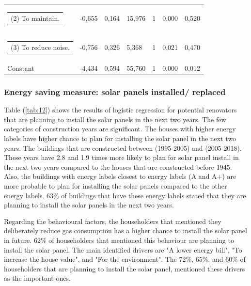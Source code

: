 \documentclass[preprint,12pt,3p]{elsarticle}
\begin{document}
\begin{footnotesize}
\begin{longtable}[c]{@{}lllllll@{}}
\begin{tabular}[c]{@{}l@{}}(2) To maintain.\end{tabular}                     & -0,655 & 0,164 & 15,976 & 1  & 0,000 & 0,520  \\
\begin{tabular}[c]{@{}l@{}}(3) To reduce noise.\end{tabular}                         & -0,756 & 0,326 & 5,368  & 1  & 0,021 & 0,470  \\
Constant                                                                                         & -4,434 & 0,594 & 55,760 & 1  & 0,000 & 0,012  \\* \bottomrule
\end{longtable}
\end{footnotesize}

\pagebreak

\subsubsection{Energy saving measure: solar panels installed/ replaced}


Table (\ref{tab:12}) shows the results of logistic regression for potential renovators that are planning to install the solar panels in the next two years. The few categories of construction years are significant. The houses with higher energy labels have higher chance to plan for installing the solar panel in the next two years. The buildings that are constructed between (1995-2005) and (2005-2018). These years have 2.8 and 1.9 times more likely to plan for solar panel install in the next two years compared to the houses that are constructed before 1945. Also, the buildings with energy labels closest to energy labels (A and A+) are more probable to plan for installing the solar panels compared to the other energy labels. 63\% of buildings that have these energy labels stated that they are planning to install the solar panels in the next two years. 

Regarding the behavioural factors, the householders that mentioned they deliberately reduce gas consumption has a higher chance to install the solar panel in future. 62\% of householders that mentioned this behaviour are planning to install the solar panel. The main identified drivers are "A lower energy bill", "To increase the house value", and "For the environment". The 72\%, 65\%, and 60\% of householders that are planning to install the solar panel, mentioned these drivers as the important ones. 
\end{document}
